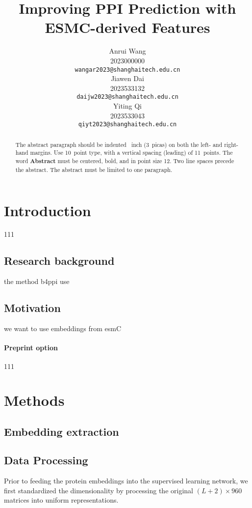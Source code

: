 \documentclass{article}
\title{Improving PPI Prediction with ESMC-derived Features}
\author{
	Anrui Wang \\
	2023000000 \\
	\texttt{wangar2023@shanghaitech.edu.cn}\\
	\AND
	Jiawen Dai \\
	2023533132 \\
	\texttt{daijw2023@shanghaitech.edu.cn}\\
	 \AND
	 Yiting Qi \\
	 2023533043 \\
	 \texttt{qiyt2023@shanghaitech.edu.cn}\\
}
\begin{document}
	
	
	\maketitle
	
	
	\begin{abstract}
		The abstract paragraph should be indented ~inch (3~picas) on
		both the left- and right-hand margins. Use 10~point type, with a vertical
		spacing (leading) of 11~points.  The word \textbf{Abstract} must be centered,
		bold, and in point size 12. Two line spaces precede the abstract. The abstract
		must be limited to one paragraph.
	\end{abstract}
	
	
	\section{Introduction}

	
	111
	
	
	\subsection{Research background}
	
	
	the method b4ppi use
	
	
	\subsection{Motivation}
	
	
	we want to use embeddings from esmC
	
	
	\paragraph{Preprint option}
	111
	
	
	\section{Methods}

	\subsection{Embedding extraction}
	\subsection{Data Processing}

	Prior to feeding the protein embeddings into the supervised learning network, we first standardized the dimensionality by processing the original $(L+2) \times 960$ matrices into uniform representations.
	
\end{document}
